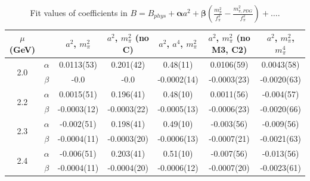 \documentclass[12pt]{extarticle}
\begin{document}
\begin{table}[h!]
\begin{center}
\begin{tabular}{|c c|c|c|c|c|c|}
\hline
$\mu$ (GeV) &  & $a^2$, $m_\pi^2$& $a^2$, $m_\pi^2$ (no C)& $a^2$, $a^4$, $m_\pi^2$& $a^2$, $m_\pi^2$ (no M3, C2)& $a^2$, $m_\pi^2$, $m_\pi^4$\\
\hline
\multirow{2}{0.5in}{2.0} & $\alpha$ & 0.0113(53)& 0.201(42)& 0.48(11)& 0.0106(59)& 0.0043(58)\\
 & $\beta$ & -0.0& -0.0& -0.0002(14)& -0.0003(23)& -0.0020(63)\\
\hline
\multirow{2}{0.5in}{2.2} & $\alpha$ & 0.0015(51)& 0.196(41)& 0.48(10)& 0.0011(56)& -0.004(57)\\
 & $\beta$ & -0.0003(12)& -0.0003(22)& -0.0005(13)& -0.0006(23)& -0.0020(66)\\
\hline
\multirow{2}{0.5in}{2.3} & $\alpha$ & -0.002(51)& 0.198(41)& 0.49(10)& -0.003(56)& -0.009(56)\\
 & $\beta$ & -0.0004(11)& -0.0003(20)& -0.0006(13)& -0.0007(21)& -0.0021(63)\\
\hline
\multirow{2}{0.5in}{2.4} & $\alpha$ & -0.006(51)& 0.203(41)& 0.51(10)& -0.007(56)& -0.013(56)\\
 & $\beta$ & -0.0004(11)& -0.0004(20)& -0.0006(12)& -0.0007(20)& -0.0023(61)\\
\hline
\end{tabular}
\caption{Fit values of coefficients in $B = B_{phys} + \mathbf{\alpha} a^2 + \mathbf{\beta}\left(\frac{m_\pi^2}{f_\pi^2}-\frac{m_{\pi,PDG}^2}{f_\pi^2}\right) + \ldots$.}
\end{center}
\end{table}




















\clearpage
\end{document}
